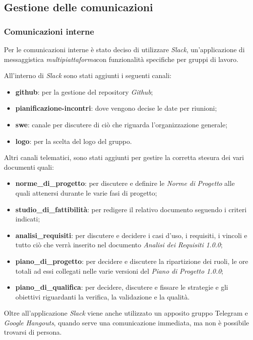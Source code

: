    	\subsection{Gestione delle comunicazioni}
   		\subsubsection{Comunicazioni interne}
   		Per le comunicazioni interne è stato deciso di utilizzare \textit{ Slack\glos}, un'applicazione di messaggistica \textit{multipiattaforma}\glo con funzionalità specifiche per gruppi di lavoro. 
   		
   		\noindent All'interno di \textit{Slack\glo} sono stati aggiunti i seguenti canali:
   		\begin{itemize}
   			\item \textbf{github}: per la gestione del repository \textit{Github\glo};
   			\item \textbf{pianificazione-incontri}: dove vengono decise le date per riunioni;
   			\item \textbf{swe}: canale per discutere di ciò che riguarda l'organizzazione generale;
   			\item \textbf{logo}: per la scelta del logo del gruppo.
   			
   		\end{itemize}
   		Altri canali telematici, sono stati aggiunti per gestire la corretta stesura dei vari documenti quali:
   		\begin{itemize}
   			\item \textbf{norme\_di\_progetto}: per discutere e definire le \textit{Norme di Progetto\doc} alle quali attenersi durante le varie fasi di progetto;
   			\item \textbf{studio\_di\_fattibilità}: per redigere il relativo documento seguendo i criteri indicati;
   			\item \textbf{analisi\_requisiti}: per discutere e decidere i casi d'uso, i requisiti, i vincoli e tutto ciò che verrà inserito nel documento \textit{Analisi dei Requisiti 1.0.0\docs};
   			\item \textbf{piano\_di\_progetto}: per decidere e discutere la ripartizione dei ruoli, le ore totali ad essi collegati nelle varie versioni del \textit{Piano di Progetto 1.0.0\docs};
   			\item \textbf{piano\_di\_qualifica}: per decidere, discutere e fissare le strategie e gli obiettivi riguardanti la verifica, la validazione e la qualità.
   		\end{itemize}
   		Oltre all'applicazione \textit{Slack\glo} viene anche utilizzato un apposito gruppo Telegram e \textit{Google Hangouts\glo}, quando serve una comunicazione immediata, ma non è possibile trovarsi di persona.
   		
